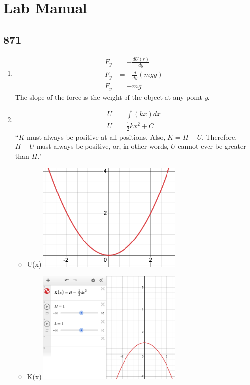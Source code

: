 \documentclass{article}
\begin{document}
\section{Lab Manual}

\subsection{871}

\begin{enumerate}[label = \textbf{(\alph*)}]
	\item
		\begin{align*}
			F_y & = -\frac{dU(r)}{dy} \\
			F_y & = -\frac{d}{dy} \left( mgy \right) \\
			F_y & = -mg
		\end{align*}
		The slope of the force is the weight of the object at any point $ y $.
	\item
		\begin{align*}
			U & = \int \left( kx \right) dx \\
			U & = \frac{1}{2}kx^2 + C
		\end{align*}
		``$ K $ must always be positive at all positions. Also, $ K = H - U $. Therefore, $ H - U $ must always be positive, or, in other words, $ U $ cannot ever be greater than $ H $."
		\begin{itemize}
			\item U(x) \includegraphics[width = 200pt]{graph_3.png}
			\item K(x) \includegraphics[width = 200pt]{graph_4.png}

\end{itemize}
\end{enumerate}
\end{document}
